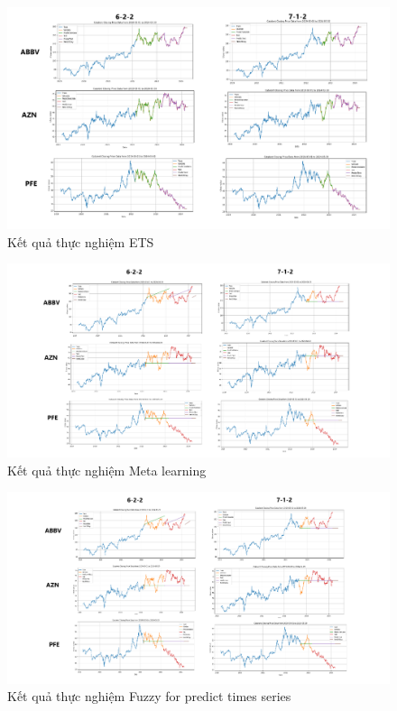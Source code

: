 \documentclass[conference]{IEEEtran}
\begin{document}
\begin{figure}[H]
    \centering
    \begin{minipage}{0.5\textwidth}
    \centering
    \includegraphics[width=1\textwidth]{Image/ETS.png}
    \caption{Kết quả thực nghiệm ETS}
    \label{fig:1}
    \end{minipage}
\end{figure}
\begin{figure}[H]
    \centering
    \begin{minipage}{0.5\textwidth}
    \centering
    \includegraphics[width=1\textwidth]{Image/meta learning.png}
    \caption{Kết quả thực nghiệm Meta learning}
    \label{fig:1}
    \end{minipage}
\end{figure}
\begin{figure}[H]
    \centering
    \begin{minipage}{0.5\textwidth}
    \centering
    \includegraphics[width=1\textwidth]{Image/Fuzzy for predict times series.png}
    \caption{Kết quả thực nghiệm Fuzzy for predict times series}
    \label{fig:1}
    \end{minipage}
\end{figure}
\end{document}

